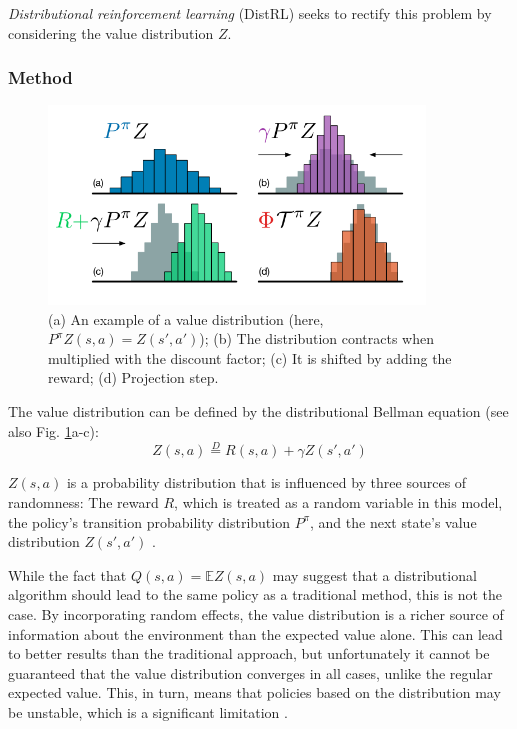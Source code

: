 \documentclass[runningheads]{llncs}
\begin{document}
\textit{Distributional reinforcement learning} (DistRL) \cite{bellemare2017distributional} seeks to rectify this problem by considering the value distribution $Z$.

\subsubsection{Method}

\begin{figure}
    \centering
    \includegraphics[width=10cm]{submission/figures/figure-distr.png}
    \caption{(a) An example of a value distribution (here, $P^\pi Z(s,a) = Z(s',a')$); (b) The distribution contracts when multiplied with the discount factor; (c) It is shifted by adding the reward; (d) Projection step. \cite{bellemare2017distributional} }
    \label{fig-distr}
\end{figure}

The value distribution can be defined by the distributional Bellman equation (see also Fig. \ref{fig-distr}a-c): $$Z(s,a) \overset{D}{=} R(s,a) + \gamma Z(s',a')$$

$Z(s,a)$ is a probability distribution that is influenced by three sources of randomness: The reward $R$, which is treated as a random variable in this model, the policy's transition probability distribution $P^\pi$, and the next state's value distribution $Z(s',a')$ \cite{bellemare2017distributional}.

While the fact that $Q(s,a) = \mathbb{E} Z(s,a)$ may suggest that a distributional algorithm should lead to the same policy as a traditional method, this is not the case. By incorporating random effects, the value distribution is a richer source of information about the environment than the expected value alone. This can lead to better results than the traditional approach, but unfortunately it cannot be guaranteed that the value distribution converges in all cases, unlike the regular expected value. This, in turn, means that policies based on the distribution may be unstable, which is a significant limitation \cite{bellemare2017distributional}.
\end{document}
